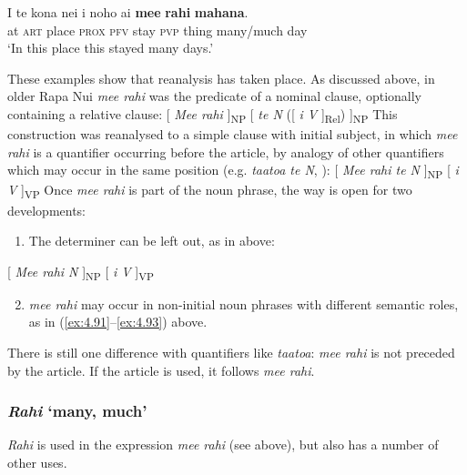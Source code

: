\ea\label{ex:4.93}
\gll {\ꞌ}I te kona nei i noho ai \textbf{me{\ꞌ}e} \textbf{rahi} \textbf{mahana}. \\
at \textsc{art} place \textsc{prox} \textsc{pfv} stay \textsc{pvp} thing many/much day \\

\glt
‘In this place this stayed many days.’ \textstyleExampleref{[R420.055]} 
\z

These examples show that reanalysis has taken place. As discussed above, in older Rapa Nui \textit{me{\ꞌ}e rahi} was the predicate of a nominal clause, optionally containing a relative clause:
\ea \label{ex:4.i}
[ \textit{Me{\ꞌ}e rahi} ]\textsubscript{NP} [ \textit{te N} ([ \textit{i V} ]\textsubscript{Rel}) ]\textsubscript{NP} 
\z
This construction was reanalysed to a simple clause with initial subject, in which \textit{me{\ꞌ}e rahi} is a quantifier occurring before the article, by analogy of other quantifiers which may occur in the same position (e.g. \textit{ta{\ꞌ}ato{\ꞌ}a te N}, ):
\ea \label{ex:4.ii}
 [ \textit{Me{\ꞌ}e rahi te N} ]\textsubscript{NP} [ \textit{i V} ]\textsubscript{VP} 
\z
Once \textit{me{\ꞌ}e rahi} is part of the noun phrase, the way is open for two developments:

\begin{enumerate}
\item 
The determiner can be left out, as in  above:

\end{enumerate}
\ea \label{ex:4.iii}
 [ \textit{Me{\ꞌ}e rahi N} ]\textsubscript{NP} [ \textit{i V} ]\textsubscript{VP}
\z
\begin{enumerate}
\setcounter{enumi}{1}
\item 
\textit{me{\ꞌ}e rahi} may occur in non-initial noun phrases with different semantic roles, as in (\ref{ex:4.91}–\ref{ex:4.93}) above. 

\end{enumerate}

There is still one difference with quantifiers like \textit{ta{\ꞌ}ato{\ꞌ}a}: \textit{me{\ꞌ}e rahi} is not preceded by the article. If the article is used, it follows \textit{me{\ꞌ}e rahi}.
\subsubsection{\textit{Rahi}\textit{} ‘many, much’}\label{sec:4.4.7.2}
\textit{Rahi} is used in the expression \textit{me{\ꞌ}e rahi} (see above), but also has a number of other uses.

